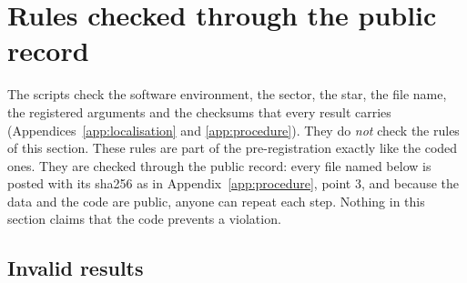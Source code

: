 \section{Rules checked through the public record} \label{app:public}

The scripts check the software environment, the sector, the star, the file name, the registered arguments and the
checksums that every result carries (Appendices~\ref{app:localisation} and \ref{app:procedure}). They do \emph{not}
check the rules of this section. These rules are part of the pre-registration exactly like the coded ones. They are
checked through the public record: every file named below is posted with its sha256 as in
Appendix~\ref{app:procedure}, point 3, and because the data and the code are public, anyone can repeat each step.
Nothing in this section claims that the code prevents a violation.

\subsection{Invalid results} \label{app:p1}

